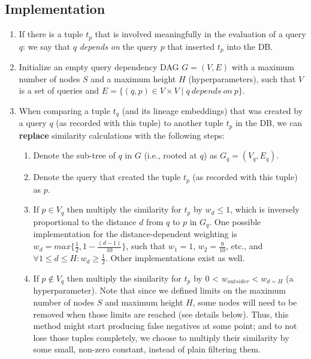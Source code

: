 \subsection{Implementation}
\begin{enumerate}
    \item If there is a tuple $t_p$ that is involved meaningfully in the evaluation of a query $q$: we say that $q$ \textit{depends on} the query $p$ that inserted $t_p$ into the DB.
    \item Initialize an empty query dependency DAG $G = (V, E)$ with a maximum number of nodes $S$ and a maximum height $H$ (hyperparameters), such that $V$ is a set of queries and $E = \{(q, p) \in V\! \times\!V\; |\; q\: depends\: on\: p\}$. 
    \item When comparing a tuple $t_q$ (and its lineage embeddings) that was created by a query $q$ (as recorded with this tuple) to another tuple $t_p$ in the DB, we can \textbf{replace} similarity calculations with the following steps:
    \begin{enumerate}
        \item Denote the sub-tree of $q$ in $G$ (i.e., rooted at $q$) as $G_q = (V_q, E_q)$.
        \item Denote the query that created the tuple $t_p$ (as recorded with this tuple) as $p$.
        \item If $p \in V_q$ then multiply the similarity for $t_p$ by $w_d \leq 1$, which is inversely proportional to the distance $d$ from $q$ to $p$ in $G_q$. One possible implementation for the distance-dependent weighting is $w_d = max\{\frac{1}{2}, 1 - \frac{(d - 1)}{10}\}$, such that $w_1 = 1$, $w_2 = \frac{9}{10}$, etc., and $\forall 1\leq d\leq H: w_d \geq \frac{1}{2}$. Other implementations exist as well. 
        \item If $p \notin V_q$ then multiply the similarity for $t_p$ by 0 < $w_{outsider} < w_{d=H}$ (a hyperparameter). Note that since we defined limits on the maximum number of nodes $S$ and maximum height $H$, some nodes will need to be removed when those limits are reached (see details below). Thus, this method might start producing false negatives at some point; and to not lose those tuples completely, we choose to multiply their similarity by some small, non-zero constant, instead of plain filtering them.
    \end{enumerate}
\end{enumerate}

